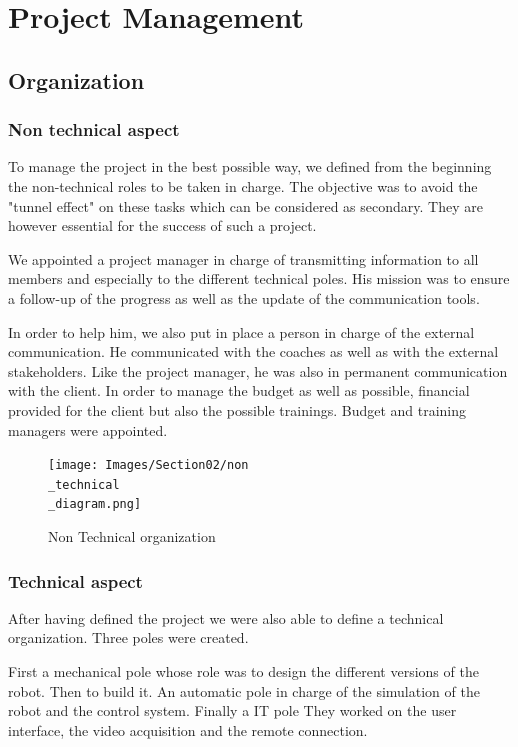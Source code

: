 \section{Project Management}\insertloftspace
\setcounter{figure}{0}\setcounter{table}{0}

\subsection{Organization}
\subsubsection{Non technical aspect}

To manage the project in the best possible way, we defined from the beginning the non-technical roles to be taken in charge. The objective was to avoid the "tunnel effect" on these tasks which can be considered as secondary. They are however essential for the success of such a project. 

\bigbreak
We appointed a project manager in charge of transmitting information to all members and especially to the different technical poles. His mission was to ensure a follow-up of the progress as well as the update of the communication tools. 

\bigbreak
In order to help him, we also put in place a person in charge of the external communication. He communicated with the coaches as well as with the external stakeholders. Like the project manager, he was also in permanent communication with the client. In order to manage the budget as well as possible, financial provided for the client but also the possible trainings. Budget and training managers were appointed. 

\begin{figure}[ht]
    \centering
    \texttt{[image: Images/Section02/non\\\_technical\\\_diagram.png]}
    \caption{Non Technical organization}
    \label{fig:nonTechOrga}
\end{figure}

\subsubsection{Technical aspect}

After having defined the project we were also able to define a technical organization. Three poles were created. 

\bigbreak
First a mechanical pole whose role was to design the different versions of the robot. Then to build it. An automatic pole in charge of the simulation of the robot and the control system. Finally a IT pole They worked on the user interface, the video acquisition and the remote connection.

